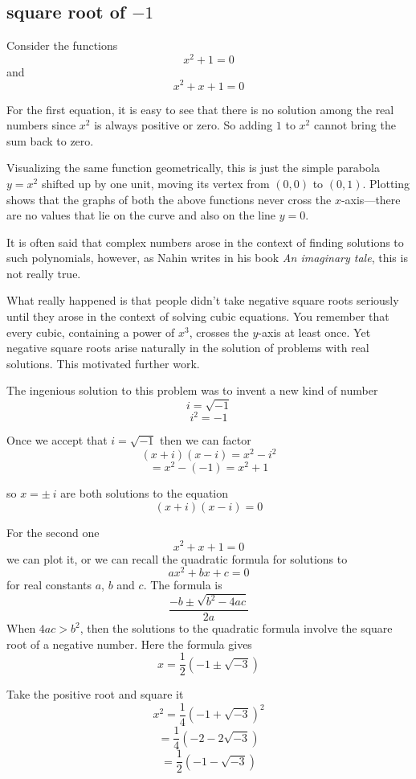 \documentclass[11pt, oneside]{article}
\begin{document}
\subsection*{square root of $-1$}

Consider the functions
\[ x^2 + 1 = 0 \]
and
\[ x^2 + x + 1 = 0 \]

For the first equation, it is easy to see that there is no solution among the real numbers since $x^2$ is always positive or zero.  So adding $1$ to $x^2$ cannot bring the sum back to zero.

Visualizing the same function geometrically, this is just the simple parabola $y=x^2$ shifted up by one unit, moving its vertex from $(0,0)$ to $(0,1)$.  Plotting shows that the graphs of both the above functions never cross the $x$-axis---there are no values that lie on the curve and also on the line $y=0$.

It is often said that complex numbers arose in the context of finding solutions to such polynomials, however, as Nahin writes in his book \emph{An imaginary tale}, this is not really true.

What really happened is that people didn't take negative square roots seriously until they arose in the context of solving cubic equations.  You remember that every cubic, containing a power of $x^3$, crosses the $y$-axis at least once.  Yet negative square roots arise naturally in the solution of problems with real solutions.  This motivated further work.

The ingenious solution to this problem was to invent a new kind of number
\[ i = \sqrt{-1} \]
\[ i^2 = -1 \]

Once we accept that $i = \sqrt{-1}$
then we can factor
\[ (x + i)(x - i) = x^2 - i^2 \]
\[ = x^2 - (-1) = x^2 + 1 \]

so $x = \pm \ i$ are both solutions to the equation 
\[ (x + i)(x - i) = 0 \]

For the second one
\[ x^2 + x + 1 = 0 \]
we can plot it, or we can recall the quadratic formula for solutions to
\[ ax^2 + bx + c = 0 \]
for real constants $a$, $b$ and $c$.  The formula is
\[ \frac{-b \pm \sqrt{b^2 - 4ac}}{2a} \]
When $4ac > b^2$, then the solutions to the quadratic formula involve the square root of a negative number.  Here the formula gives
\[ x = \frac{1}{2} (-1 \pm \sqrt{-3}) \]

Take the positive root and square it
\[ x^2 = \frac{1}{4} (-1 + \sqrt{-3})^2 \]
\[ = \frac{1}{4} (-2 - 2 \sqrt{-3}) \]
\[ =  \frac{1}{2} (-1 - \sqrt{-3})  \]
\end{document}
